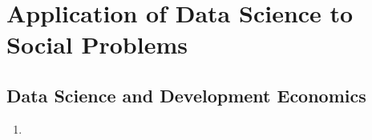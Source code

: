 \section{Application of Data Science to Social Problems}
\subsection{Data Science and Development Economics}

\begin{enumerate}
\item  \cite{Duflo_2000}
\end{enumerate}
